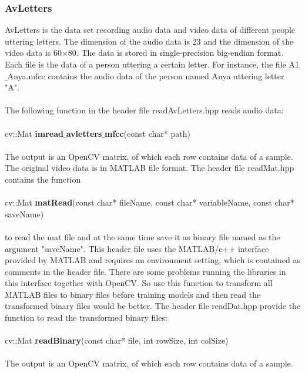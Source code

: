 \documentclass[12pt]{article}
\begin{document}
\subsubsection{AvLetters}
AvLetters is the data set recording audio data and video data of different people uttering letters. The dimension of the audio data is 23 and the dimension of the video data is 60$\times$80. The data is stored in single-precision big-endian format. Each file is the data of a person uttering a certain letter. For instance, the file A1$\_$Anya.mfcc contains the audio data of the person named Anya uttering letter "A". \\
\\
The following function in the header file readAvLetters.hpp reads audio data:\\
\\
cv::Mat \textbf{imread$\_$avletters$\_$mfcc}(const char* path)\\
\\
The output is an OpenCV matrix, of which each row contains data of a sample. The original video data is in MATLAB file format. The header file readMat.hpp contains the function\\
\\
cv::Mat \textbf{matRead}(const char* fileName, const char* variableName, const char* saveName)\\
\\
to read the mat file and at the same time save it as binary file named as the argument "saveName". This header file uses the MATLAB/c++ interface provided by MATLAB and requires an environment setting, which is contained as comments in the header file. There are some problems running the libraries in this interface together with OpenCV. So use this function to transform all MATLAB files to binary files before training models and then read the transformed binary files would be better. The header file readDat.hpp provide the function to read the transformed binary files:\\
\\
cv::Mat \textbf{readBinary}(const char* file, int rowSize, int colSize)\\
\\
The output is an OpenCV matrix, of which each row contains data of a sample.
\end{document}
